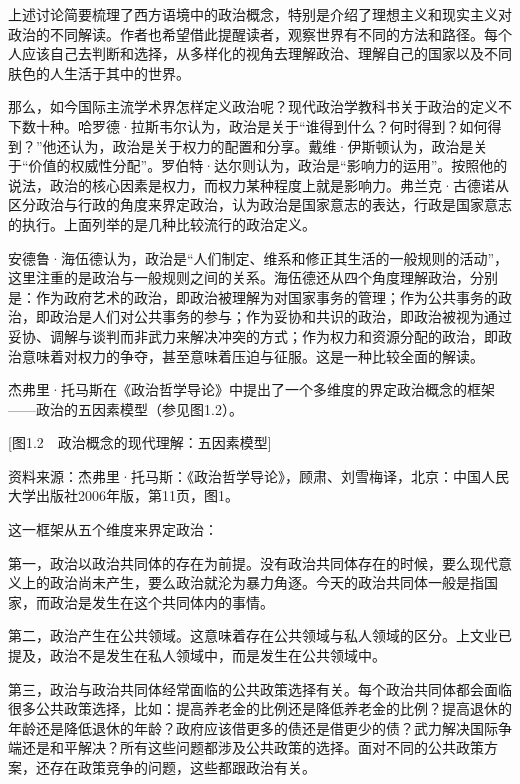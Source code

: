上述讨论简要梳理了西方语境中的政治概念，特别是介绍了理想主义和现实主义对政治的不同解读。作者也希望借此提醒读者，观察世界有不同的方法和路径。每个人应该自己去判断和选择，从多样化的视角去理解政治、理解自己的国家以及不同肤色的人生活于其中的世界。


那么，如今国际主流学术界怎样定义政治呢？现代政治学教科书关于政治的定义不下数十种。哈罗德·拉斯韦尔认为，政治是关于“谁得到什么？何时得到？如何得到？”他还认为，政治是关于权力的配置和分享。戴维·伊斯顿认为，政治是关于“价值的权威性分配”。罗伯特·达尔则认为，政治是“影响力的运用”。按照他的说法，政治的核心因素是权力，而权力某种程度上就是影响力。弗兰克·古德诺从区分政治与行政的角度来界定政治，认为政治是国家意志的表达，行政是国家意志的执行。上面列举的是几种比较流行的政治定义。

安德鲁·海伍德认为，政治是“人们制定、维系和修正其生活的一般规则的活动”，这里注重的是政治与一般规则之间的关系。海伍德还从四个角度理解政治，分别是：作为政府艺术的政治，即政治被理解为对国家事务的管理；作为公共事务的政治，即政治是人们对公共事务的参与；作为妥协和共识的政治，即政治被视为通过妥协、调解与谈判而非武力来解决冲突的方式；作为权力和资源分配的政治，即政治意味着对权力的争夺，甚至意味着压迫与征服。这是一种比较全面的解读。

杰弗里·托马斯在《政治哲学导论》中提出了一个多维度的界定政治概念的框架——政治的五因素模型（参见图1.2）。

[图1.2　政治概念的现代理解：五因素模型]

资料来源：杰弗里·托马斯：《政治哲学导论》，顾肃、刘雪梅译，北京：中国人民大学出版社2006年版，第11页，图1。

这一框架从五个维度来界定政治：

第一，政治以政治共同体的存在为前提。没有政治共同体存在的时候，要么现代意义上的政治尚未产生，要么政治就沦为暴力角逐。今天的政治共同体一般是指国家，而政治是发生在这个共同体内的事情。

第二，政治产生在公共领域。这意味着存在公共领域与私人领域的区分。上文业已提及，政治不是发生在私人领域中，而是发生在公共领域中。

第三，政治与政治共同体经常面临的公共政策选择有关。每个政治共同体都会面临很多公共政策选择，比如：提高养老金的比例还是降低养老金的比例？提高退休的年龄还是降低退休的年龄？政府应该借更多的债还是借更少的债？武力解决国际争端还是和平解决？所有这些问题都涉及公共政策的选择。面对不同的公共政策方案，还存在政策竞争的问题，这些都跟政治有关。

